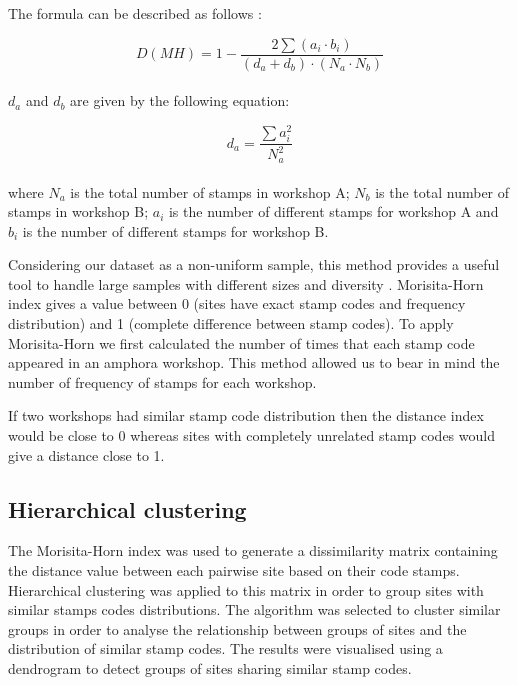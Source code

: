 \documentclass[review]{elsarticle}
\newcommand{\memo}[2]{\textcolor{#1}{#2}}
\newcommand{\xavi}[1]{\memo{magenta}{XRC: #1\\}}
\begin{document}
The formula can be described as follows \citep{magurran_measuring_2013}:

\begin{equation}
D(MH) = 1- \frac{2 \sum(a_{i} \cdot b_{i})}{(d_{a} + d_{b}) \cdot (N_{a} \cdot N_{b})}
\end{equation} \\

$d_{a}$ and $d_{b}$ are given by the following equation:

\begin{equation}
d_{a} = \frac{\sum a_{i}^{2}}{N_{a}^{2}} 
\end{equation} \\

where $N_{a}$ is the total number of stamps in workshop A; $N_{b}$ is the total number of stamps in workshop B; $a_{i}$ is the number of different stamps for workshop A and $b_{i}$ is the number of different stamps for workshop B.

Considering our dataset as a non-uniform sample, this method provides a useful tool to handle large samples with different sizes and diversity \citep{wolda_similarity_1981}. Morisita-Horn index gives a value between 0 (sites have exact stamp codes and frequency distribution) and 1 (complete difference between stamp codes). To apply Morisita-Horn we first calculated the number of times that each stamp code appeared in an amphora workshop. 
This method allowed us to bear in mind the number of frequency of stamps for each workshop. 

If two workshops had similar stamp code distribution then the distance index would be close to 0 whereas sites with completely unrelated stamp codes would give a distance close to 1.

\subsection{Hierarchical clustering}

The Morisita-Horn index was used to generate a dissimilarity matrix containing the distance value between each pairwise site based on their code stamps. Hierarchical clustering was applied to this matrix in order to group sites with similar stamps codes distributions. The algorithm was selected to cluster similar groups in order to analyse the relationship between groups of sites and the distribution of similar stamp codes. The results were visualised using a dendrogram to detect groups of sites sharing similar stamp codes.  
\end{document}

